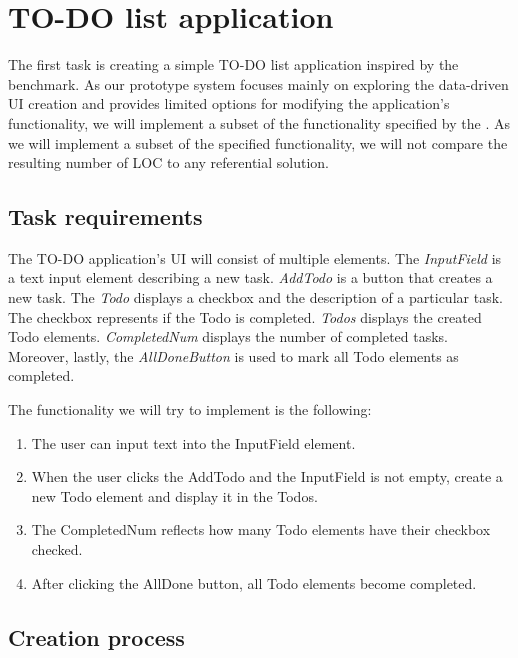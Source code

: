 \section{TO-DO list application}
The first task is creating a simple TO-DO list application inspired by the \citet{TodoMVC} benchmark.
As our prototype system focuses mainly on exploring the data-driven UI creation and provides limited options for modifying the application's functionality,
we will implement a subset of the functionality specified by the \citet{todo-spec}.
As we will implement a subset of the specified functionality, we will not compare the resulting number of LOC to any referential solution.

\subsection{Task requirements}

The TO-DO application's UI will consist of multiple elements.
The \emph{InputField} is a text input element describing a new task.
\emph{AddTodo} is a button that creates a new task.
The \emph{Todo} displays a checkbox and the description of a particular task. The checkbox represents if the Todo is completed.
\emph{Todos} displays the created Todo elements.
\emph{CompletedNum} displays the number of completed tasks.
Moreover, lastly, the \emph{AllDoneButton} is used to mark all Todo elements as completed.

The functionality we will try to implement is the following:
\begin{enumerate}
	\item The user can input text into the InputField element.
	\item When the user clicks the AddTodo and the InputField is not empty, create a new Todo element and display it in the Todos.
	\item The CompletedNum reflects how many Todo elements have their checkbox checked.
	\item After clicking the AllDone button, all Todo elements become completed.
\end{enumerate}
\medskip
\subsection{Creation process}

